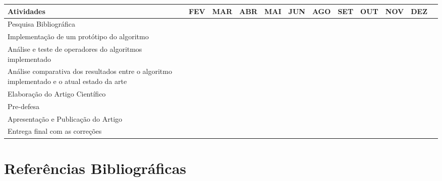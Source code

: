 \documentclass[a4paper,12pt]{article}
\begin{document}
\begin{table}[h]

\centering
\setlength{\tabcolsep}{3pt} 

\footnotesize{
  \begin{tabular}{|p{}|c|c|c|c|c|c|c|c|c|c|c|}

    \hline
    \small{Atividades} & FEV & MAR & ABR & MAI & JUN & AGO & SET & OUT & NOV & DEZ\\
    \hline
    
    Pesquisa Bibliográfica & \cellcolor{red} & \cellcolor{red} & \cellcolor{red} & \cellcolor{red} & \cellcolor{red} & & & & & \\
    \hline
    Implementação de um protótipo do algoritmo & & & & \cellcolor{red} & \cellcolor{red} & \cellcolor{red} & \cellcolor{red} & & & \\
    \hline
    Análise e teste de operadores do algoritmos implementado & & & & & & \cellcolor{red} & \cellcolor{red} & & & \\
    \hline
    Análise comparativa dos resultados entre o algoritmo implementado e o atual estado da arte & & & & & & \cellcolor{red} & \cellcolor{red} & \cellcolor{red} & & \\
    \hline
    Elaboração do Artigo Científico & & & \cellcolor{red} & \cellcolor{red} & \cellcolor{red} & \cellcolor{red} & \cellcolor{red} & \cellcolor{red} & & \\
    \hline
    Pre-defesa & & & & & & & & \cellcolor{red} & & \\
    \hline
    Apresentação e Publicação do Artigo & & & & & & & & & \cellcolor{red} & \\
    \hline
    Entrega final com as correções & & & & & & & & & & \cellcolor{red} \\  
    \hline

  \end{tabular}
}

\end{table}


\newpage


\section{Referências Bibliográficas}

\end{document}
